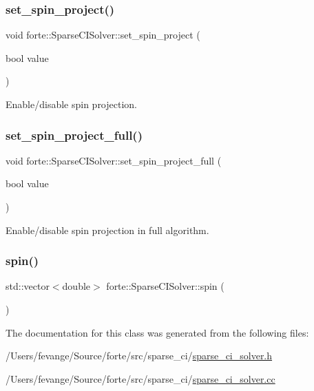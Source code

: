 \subsubsection{\texorpdfstring{set\+\_\+spin\+\_\+project()}{set\_spin\_project()}}
{\footnotesize\ttfamily void forte\+::\+Sparse\+C\+I\+Solver\+::set\+\_\+spin\+\_\+project (\begin{DoxyParamCaption}\item[{bool}]{value }\end{DoxyParamCaption})}



Enable/disable spin projection. 

\mbox{\label{classforte_1_1_sparse_c_i_solver_a9aebb57a279e852c9958fa5252f55b88}} 
\subsubsection{\texorpdfstring{set\+\_\+spin\+\_\+project\+\_\+full()}{set\_spin\_project\_full()}}
{\footnotesize\ttfamily void forte\+::\+Sparse\+C\+I\+Solver\+::set\+\_\+spin\+\_\+project\+\_\+full (\begin{DoxyParamCaption}\item[{bool}]{value }\end{DoxyParamCaption})}



Enable/disable spin projection in full algorithm. 

\mbox{\label{classforte_1_1_sparse_c_i_solver_abf0bf012929ae40717c84464804960bc}} 
\subsubsection{\texorpdfstring{spin()}{spin()}}
{\footnotesize\ttfamily std\+::vector$<$double$>$ forte\+::\+Sparse\+C\+I\+Solver\+::spin (\begin{DoxyParamCaption}{ }\end{DoxyParamCaption})\hspace{0.3cm}{\ttfamily [inline]}}



The documentation for this class was generated from the following files\+:\begin{DoxyCompactItemize}
\item 
/\+Users/fevange/\+Source/forte/src/sparse\+\_\+ci/\mbox{\hyperlink{sparse__ci__solver_8h}{sparse\+\_\+ci\+\_\+solver.\+h}}\item 
/\+Users/fevange/\+Source/forte/src/sparse\+\_\+ci/\mbox{\hyperlink{sparse__ci__solver_8cc}{sparse\+\_\+ci\+\_\+solver.\+cc}}\end{DoxyCompactItemize}
